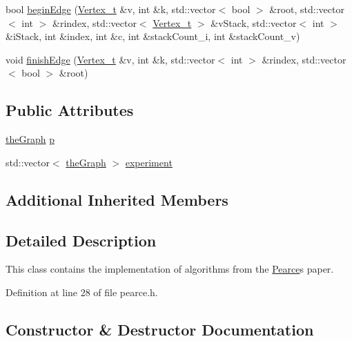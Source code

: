 \begin{DoxyCompactItemize}
\item 
bool \hyperlink{class_pearce_a6d6c641f1815e11536554077ed18c10e}{begin\+Edge} (\hyperlink{class_graph_component_ae67114a6ce5a001dc35e1996e1b45aa0}{Vertex\+\_\+t} \&v, int \&k, std\+::vector$<$ bool $>$ \&root, std\+::vector$<$ int $>$ \&rindex, std\+::vector$<$ \hyperlink{class_graph_component_ae67114a6ce5a001dc35e1996e1b45aa0}{Vertex\+\_\+t} $>$ \&v\+Stack, std\+::vector$<$ int $>$ \&i\+Stack, int \&index, int \&c, int \&stack\+Count\+\_\+i, int \&stack\+Count\+\_\+v)
\item 
void \hyperlink{class_pearce_a4ed2b91ac3246895ec5d70fe3530690e}{finish\+Edge} (\hyperlink{class_graph_component_ae67114a6ce5a001dc35e1996e1b45aa0}{Vertex\+\_\+t} \&v, int \&k, std\+::vector$<$ int $>$ \&rindex, std\+::vector$<$ bool $>$ \&root)
\end{DoxyCompactItemize}
\subsection*{Public Attributes}
\begin{DoxyCompactItemize}
\item 
\hyperlink{class_graph_component_a982e0748a6e1b8dc74986f5f8b3dca5c}{the\+Graph} \hyperlink{class_pearce_a2320928312fd97f6bcb1f16684f79a03}{p}
\item 
std\+::vector$<$ \hyperlink{class_graph_component_a982e0748a6e1b8dc74986f5f8b3dca5c}{the\+Graph} $>$ \hyperlink{class_pearce_ad33eb33876fe817143afb84583934313}{experiment}
\end{DoxyCompactItemize}
\subsection*{Additional Inherited Members}


\subsection{Detailed Description}
This class contains the implementation of algorithms from the \hyperlink{class_pearce}{Pearce}\textquotesingle{}s paper. 

Definition at line 28 of file pearce.\+h.



\subsection{Constructor \& Destructor Documentation}
\mbox{\label{class_pearce_a4ad24a40c64e8f3481dd0dbbcb8d2bcb}} 

